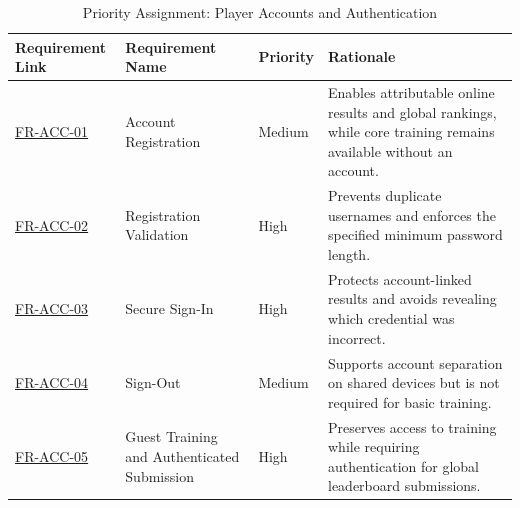 \documentclass[12pt]{article}
\begin{document}
\begin{table}[htbp]
\centering
\small
\caption{Priority Assignment: Player Accounts and Authentication}
\label{tab:priority-accounts}
\begin{tabular}{p{2.1cm} p{2.7cm} p{1.3cm} p{7.0cm}}
\hline
\textbf{Requirement Link} & \textbf{Requirement Name} & \textbf{Priority} & \textbf{Rationale} \\
\hline
\hyperref[sec:s2-accounts]{FR-ACC-01} & Account Registration & Medium & Enables attributable online results and global rankings, while core training remains available without an account. \\
\hyperref[sec:s2-accounts]{FR-ACC-02} & Registration Validation & High & Prevents duplicate usernames and enforces the specified minimum password length. \\
\hyperref[sec:s2-accounts]{FR-ACC-03} & Secure Sign-In & High & Protects account-linked results and avoids revealing which credential was incorrect. \\
\hyperref[sec:s2-accounts]{FR-ACC-04} & Sign-Out & Medium & Supports account separation on shared devices but is not required for basic training. \\
\hyperref[sec:s2-accounts]{FR-ACC-05} & Guest Training and Authenticated Submission & High & Preserves access to training while requiring authentication for global leaderboard submissions. \\
\hline
\end{tabular}
\end{table}
\end{document}

